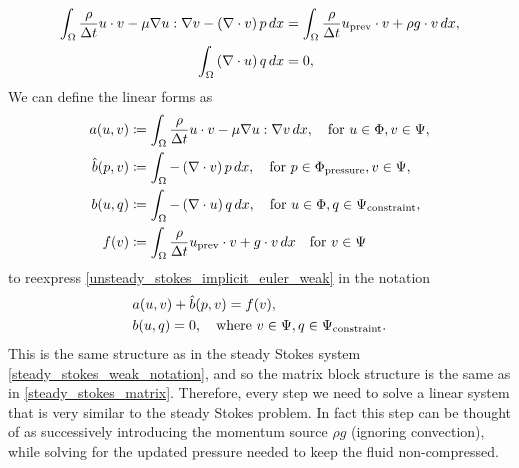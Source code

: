 \begin{equation}\label{unsteady_stokes_implicit_euler_weak}
\begin{split}
    \int_{\Omega} \frac{\rho}{\Delta t} u\cdot v - \mu\nabla u:\nabla v - \left(\nabla\cdot v\right)p\,dx
        &= \int_{\Omega} \frac{\rho}{\Delta t}{u_{\text{prev}}}\cdot v + \rho g \cdot v\,dx,\\
    \quad \int_{\Omega} \left(\nabla\cdot u\right) q\,dx &= 0,
\end{split}
\end{equation}
We can define the linear forms as
\begin{equation}
\begin{split}
    a(u, v) &\coloneqq \int_{\Omega}\frac{\rho}{\Delta t}u\cdot v -\mu\nabla u : \nabla v\,dx,\quad\text{for $u \in \Phi, v \in \Psi$},\\
    \hat{b}(p, v) &\coloneqq \int_{\Omega}-\left(\nabla\cdot v\right)p\,dx,\quad\text{for $p \in {\Phi_{\text{pressure}}}, v \in \Psi$},\\
    b(u, q) &\coloneqq \int_{\Omega}-\left(\nabla\cdot u\right)q\,dx,\quad\text{for $u \in \Phi, q \in {\Psi_{\text{constraint}}}$},\\
    f(v) &\coloneqq \int_{\Omega} \frac{\rho}{\Delta t}{u_{\text{prev}}}\cdot v + g\cdot v\,dx\quad\text{for $v \in \Psi$}
\end{split}
\end{equation}
to reexpress \eqref{unsteady_stokes_implicit_euler_weak} in the notation
\begin{equation}
\begin{split}
    &a(u, v) + \hat{b}(p, v) = f(v),\\
    &b(u, q) = 0, \quad\text{where $v \in \Psi, q \in {\Psi_{\text{constraint}}}$}.
\end{split}
\end{equation}
This is the same structure as in the steady Stokes system \eqref{steady_stokes_weak_notation},
and so the matrix block structure is the same as in \eqref{steady_stokes_matrix}. Therefore, every step we need to solve a linear system
that is very similar to the steady Stokes problem. In fact this step can be thought of as successively introducing the momentum source $\rho g$
(ignoring convection), while solving for the updated pressure needed to keep the fluid non-compressed.

